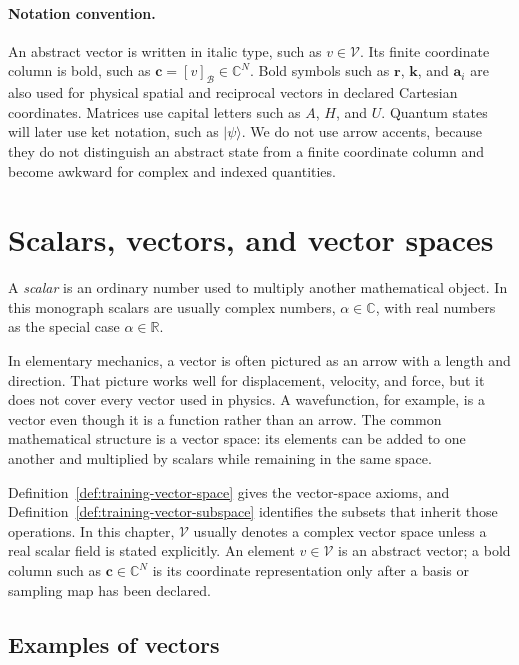 \paragraph{Notation convention.}
An abstract vector is written in italic type, such as \(v\in\mathcal V\). Its
finite coordinate column is bold, such as
\(\mathbf c=[v]_{\mathcal B}\in\mathbb C^N\). Bold symbols such as
\(\mathbf r\), \(\mathbf k\), and \(\mathbf a_i\) are also used for physical
spatial and reciprocal vectors in declared Cartesian coordinates. Matrices use
capital letters such as \(A\), \(H\), and \(U\). Quantum states will later use
ket notation, such as \(\lvert\psi\rangle\). We do not use arrow accents,
because they do not distinguish an abstract state from a finite coordinate
column and become awkward for complex and indexed quantities.

\section{Scalars, vectors, and vector spaces}

A \emph{scalar} is an ordinary number used to multiply another mathematical
object. In this monograph scalars are usually complex numbers,
\(\alpha\in\mathbb C\), with real numbers as the special case
\(\alpha\in\mathbb R\).

In elementary mechanics, a vector is often pictured as an arrow with a length
and direction. That picture works well for displacement, velocity, and force,
but it does not cover every vector used in physics. A wavefunction, for
example, is a vector even though it is a function rather than an arrow. The
common mathematical structure is a vector space: its elements can be added to
one another and multiplied by scalars while remaining in the same space.

Definition~\ref{def:training-vector-space} gives the vector-space axioms, and
Definition~\ref{def:training-vector-subspace} identifies the subsets that
inherit those operations. In this chapter, \(\mathcal V\) usually denotes a
complex vector space unless a real scalar field is stated explicitly. An
element \(v\in\mathcal V\) is an abstract vector; a bold column such as
\(\mathbf c\in\mathbb C^N\) is its coordinate representation only after a
basis or sampling map has been declared.

\subsection{Examples of vectors}

